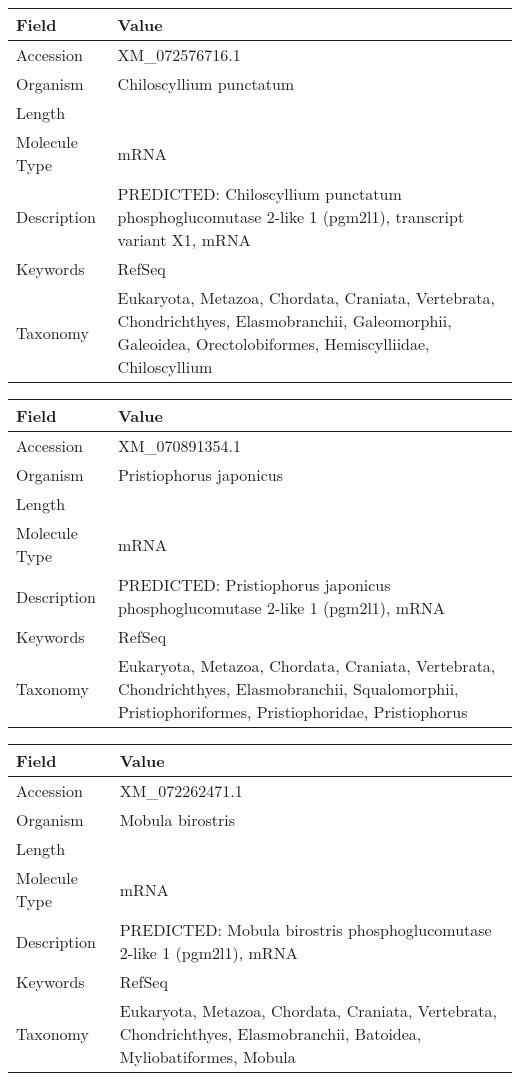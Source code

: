 \documentclass[10pt]{article}
\begin{document}
{\footnotesize
\begin{longtable}{>{\raggedright\arraybackslash}p{4.5cm} >{\raggedright\arraybackslash}p{11.5cm}}
\textbf{Field} & \textbf{Value} \\
\hline
Accession & XM\_072576716.1 \\
Organism & Chiloscyllium punctatum \\
Length & 6028 \\
Molecule Type & mRNA \\
Description & PREDICTED: Chiloscyllium punctatum phosphoglucomutase 2-like 1 (pgm2l1), transcript variant X1, mRNA \\
Keywords & RefSeq \\
Taxonomy & Eukaryota, Metazoa, Chordata, Craniata, Vertebrata, Chondrichthyes, Elasmobranchii, Galeomorphii, Galeoidea, Orectolobiformes, Hemiscylliidae, Chiloscyllium \\
\end{longtable}
}

{\footnotesize
\begin{longtable}{>{\raggedright\arraybackslash}p{4.5cm} >{\raggedright\arraybackslash}p{11.5cm}}
\textbf{Field} & \textbf{Value} \\
\hline
Accession & XM\_070891354.1 \\
Organism & Pristiophorus japonicus \\
Length & 6396 \\
Molecule Type & mRNA \\
Description & PREDICTED: Pristiophorus japonicus phosphoglucomutase 2-like 1 (pgm2l1), mRNA \\
Keywords & RefSeq \\
Taxonomy & Eukaryota, Metazoa, Chordata, Craniata, Vertebrata, Chondrichthyes, Elasmobranchii, Squalomorphii, Pristiophoriformes, Pristiophoridae, Pristiophorus \\
\end{longtable}
}

{\footnotesize
\begin{longtable}{>{\raggedright\arraybackslash}p{4.5cm} >{\raggedright\arraybackslash}p{11.5cm}}
\textbf{Field} & \textbf{Value} \\
\hline
Accession & XM\_072262471.1 \\
Organism & Mobula birostris \\
Length & 5678 \\
Molecule Type & mRNA \\
Description & PREDICTED: Mobula birostris phosphoglucomutase 2-like 1 (pgm2l1), mRNA \\
Keywords & RefSeq \\
Taxonomy & Eukaryota, Metazoa, Chordata, Craniata, Vertebrata, Chondrichthyes, Elasmobranchii, Batoidea, Myliobatiformes, Mobula \\
\end{longtable}
}
\end{document}
